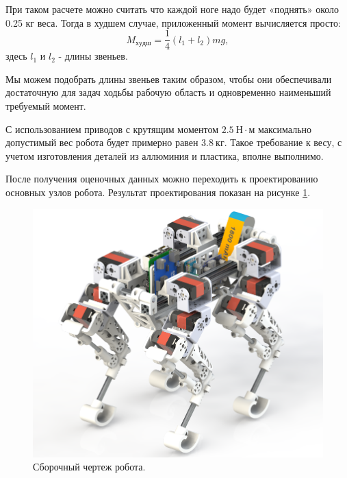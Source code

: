 При таком расчете можно считать что каждой ноге надо будет «поднять» около 0.25 кг веса. Тогда в худшем случае, приложенный момент вычисляется просто:
$$ M_{худш}= \frac 1 4 (l_{1}+l_{2}) m g, $$
\noindent здесь $l_1$ и $l_2$ - длины звеньев.

Мы можем подобрать длины звеньев таким образом, чтобы они обеспечивали достаточную для задач ходьбы рабочую область и одновременно наименьший требуемый момент.

\noindent С использованием приводов с крутящим моментом $ 2.5 \: Н \cdot м $ максимально допустимый вес робота будет примерно равен $ 3.8 \: кг $. Такое требование к весу, с учетом изготовления деталей из аллюминия и пластика, вполне выполнимо.

После получения оценочных данных можно переходить к проектированию основных узлов робота. Результат проектирования показан на рисунке \ref{fig:final_render}.

\begin{figure}[h]
    \centering
    \includegraphics[width=\textwidth]{chapter_mechanics_construction/figure20.png}
    \caption{Сборочный чертеж робота.}
    \label{fig:final_render}
\end{figure}

